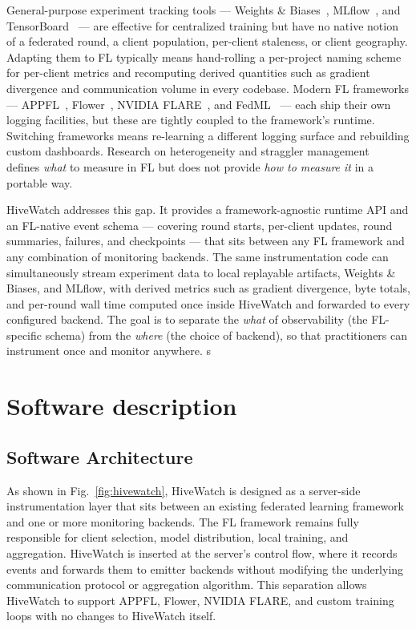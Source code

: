 \documentclass[preprint,12pt, a4paper]{elsarticle}
\begin{document}
General-purpose experiment tracking tools — Weights \& Biases~\cite{wandb}, MLflow~\cite{mlflow}, and TensorBoard~\cite{tensorboard} — are effective for centralized training but have no native notion of a federated round, a client population, per-client staleness, or client geography. Adapting them to FL typically means hand-rolling a per-project naming scheme for per-client metrics and recomputing derived quantities such as gradient divergence and communication volume in every codebase. Modern FL frameworks — APPFL~\cite{ryu2022appfl,li2025advances}, Flower~\cite{beutel2020flower}, NVIDIA FLARE~\cite{roth2022nvidia}, and FedML~\cite{he2020fedml} — each ship their own logging facilities, but these are tightly coupled to the framework's runtime. Switching frameworks means re-learning a different logging surface and rebuilding custom dashboards. Research on heterogeneity and straggler management~\cite{lai2021oort,li2024fedcompass,xie2019asynchronous,nguyen2022federated} defines \emph{what} to measure in FL but does not provide \emph{how to measure it} in a portable way.

HiveWatch addresses this gap. It provides a framework-agnostic runtime API and an FL-native event schema — covering round starts, per-client updates, round summaries, failures, and checkpoints — that sits between any FL framework and any combination of monitoring backends. The same instrumentation code can simultaneously stream experiment data to local replayable artifacts, Weights \& Biases, and MLflow, with derived metrics such as gradient divergence, byte totals, and per-round wall time computed once inside HiveWatch and forwarded to every configured backend. The goal is to separate the \emph{what} of observability (the FL-specific schema) from the \emph{where} (the choice of backend), so that practitioners can instrument once and monitor anywhere.
s

\section{Software description}
\label{sec:software}

\subsection{Software Architecture}

As shown in Fig.~\ref{fig:hivewatch}, HiveWatch is designed as a server-side instrumentation layer that sits between an existing federated learning framework and one or more monitoring backends. The FL framework remains fully responsible for client selection, model distribution, local training, and aggregation. HiveWatch is inserted at the server's control flow, where it records events and forwards them to emitter backends without modifying the underlying communication protocol or aggregation algorithm. This separation allows HiveWatch to support APPFL, Flower, NVIDIA FLARE, and custom training loops with no changes to HiveWatch itself.
\end{document}
